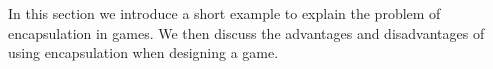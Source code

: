 In this section we introduce a short example to explain the problem of encapsulation in games. We then discuss the advantages and disadvantages of using encapsulation when designing a game.

\begin{comment}
\paragraph*{Common issues}
In the panorama of game development the two main approaches to game development are through the use of tools, or through the use of languages \cite{maggiore2013casanova}.

\textbf{Tools} are environments where developers are assisted in the creation of games through visual instruments and built-in features (such as physics).
Tools generally are focused on specific genres. A typical aspect of these tools is that they offer developers predefined functionalities (such as path finding, collision detection, and rendering), which would take a lot of time to develop and debug. These functionalities are often available in the shape of menu objects in the developing environment. The goal of tools, in general, is to allow developers to quickly prototype and deploy games, while relieving them from common tasks in game development. Typical tools, such as GameMaker, Corona, Unity3D, and RPGmaker, provide an easy-to-use interface and shortcuts for dealing with entity behavior. As long as the developer limits himself to using the components provided, the tools produce performant game code, because of their specific application in the domain of games. For behaviors that are not covered by the tool components, they often support scripting languages that allow developers to define new behaviors. However, they thereby lose the advantages of using the tool components. Moreover, the scripting languages used by tools are usually interpreted (like LUA and JavaScript), which considerably affects performance. Therefore, by using tools, developers are left with the choice of either building simple performant games that do not feature complex or new behaviors, or build more complex games by expanding the tools, which requires not only considerable development investments but also tends to lose performance.


\end{comment}
